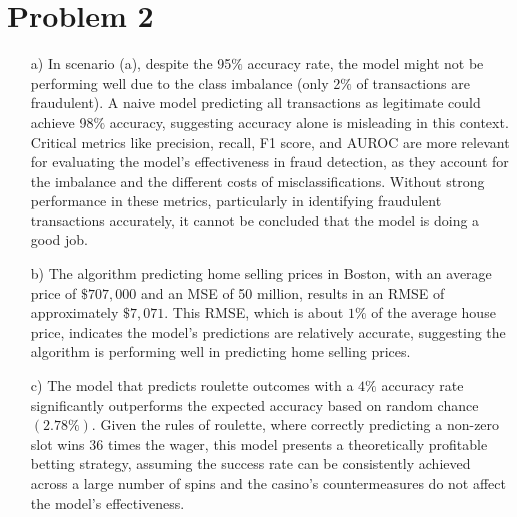 \documentclass{article}
\begin{document}
\section*{Problem 2}
    \begin{itemize}
        \item [a)]
        In scenario (a), despite the 95$\%$ accuracy rate, the model might not be performing well due to the class imbalance (only 2$\%$ of transactions are fraudulent). A naive model predicting all transactions as legitimate could achieve 98$\%$ accuracy, suggesting accuracy alone is misleading in this context. Critical metrics like precision, recall, F1 score, and AUROC are more relevant for evaluating the model's effectiveness in fraud detection, as they account for the imbalance and the different costs of misclassifications. Without strong performance in these metrics, particularly in identifying fraudulent transactions accurately, it cannot be concluded that the model is doing a good job.

        \item[b)]
        The algorithm predicting home selling prices in Boston, with an average price of $\$707,000$ and an MSE of 50 million, results in an RMSE of approximately $\$7,071$. This RMSE, which is about $1\%$ of the average house price, indicates the model's predictions are relatively accurate, suggesting the algorithm is performing well in predicting home selling prices.

        \item[c)]
        The model that predicts roulette outcomes with a $4\%$ accuracy rate significantly outperforms the expected accuracy based on random chance $(2.78\%)$. Given the rules of roulette, where correctly predicting a non-zero slot wins 36 times the wager, this model presents a theoretically profitable betting strategy, assuming the success rate can be consistently achieved across a large number of spins and the casino's countermeasures do not affect the model's effectiveness.
    \end{itemize}
    \newpage
\end{document}
